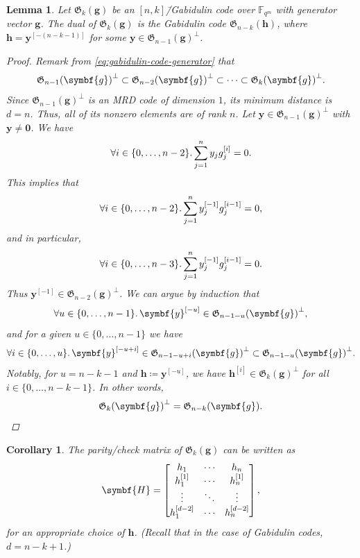 \documentclass[version=last, paper=A4, parskip=half, oneside,%
toc=bibliography, toc=listof, listof=leveldown]{scrbook}
\theoremstyle{plain}
\newtheorem{lemma}{Lemma}
\newtheorem{corollary}{Corollary}
\theoremstyle{definition}
\theoremstyle{remark}
\renewcommand*{\vec}{\symbf}
\newcommand*{\mat}{\symbf}
\newcommand*{\FF}{\ensuremath{\mathbb{F}}}
\newcommand*{\Gab}{\ensuremath{\mathfrak{G}}}
\begin{document}
\begin{lemma}
  Let \(\Gab_k(\vec{g})\) be an \([n, k]\)\=/Gabidulin code over \(\FF_{q^m}\)
  with generator vector \(\vec{g}\).  The dual of \(\Gab_k(\vec{g})\) is the
  Gabidulin code \(\Gab_{n - k}(\vec{h})\), where
  \(\vec{h} = \vec{y}^{[-(n - k - 1)]}\) for some
  \(\vec{y} \in {\Gab_{n - 1}(\vec{g})}^{\perp}\).
  \begin{proof}
    Remark from \cref{eq:gabidulin-code-generator} that
    \[
      {\Gab_{n - 1}(\vec{g})}^{\perp} \subset
      {\Gab_{n - 2}(\vec{g})}^{\perp} \subset \cdots \subset
      {\Gab_{k}(\vec{g})}^{\perp}\text.
    \]
    Since \({\Gab_{n - 1}(\vec{g})}^{\perp}\) is an MRD code of dimension \(1\),
    its minimum distance is \(d = n\).  Thus, all of its nonzero elements are of
    rank \(n\).  Let \(\vec{y} \in {\Gab_{n - 1}(\vec{g})}^{\perp}\) with
    \(\vec{y} \ne \vec{0}\).  We have
    \[
      \forall i \in \{0, \ldots, n - 2\}\ldotp
      \sum_{j = 1}^n y_j g_j^{[i]} = 0\text.
    \]
    This implies that
    \[
      \forall i \in \{0, \ldots, n - 2\}\ldotp
      \sum_{j = 1}^n y_j^{[-1]} g_j^{[i - 1]} = 0\text,
    \]
    and in particular,
    \[
      \forall i \in \{0, \ldots, n - 3\}\ldotp
      \sum_{j = 1}^n y_j^{[-1]} g_j^{[i - 1]} = 0\text.
    \]
    Thus \(\vec{y}^{[-1]} \in {\Gab_{n - 2}(\vec{g})}^{\perp}\).  We can argue
    by induction that
    \[
      \forall u \in \{0, \ldots, n - 1\}\ldotp
      \vec{y}^{[-u]} \in {\Gab_{n - 1 - u}(\vec{g})}^{\perp}\text,
    \]
    and for a given \(u \in \{0, \ldots, n - 1\}\) we have
    \[
      \forall i \in \{0, \ldots, u\}\ldotp
      \vec{y}^{[-u + i]} \in {\Gab_{n - 1 - u + i}(\vec{g})}^{\perp} \subset
      {\Gab_{n - 1 - u}(\vec{g})}^{\perp}\text.
    \]
    Notably, for \(u = n - k - 1\) and \(\vec{h} \coloneqq \vec{y}^{[-u]}\), we
    have \(\vec{h}^{[i]} \in {\Gab_k(\vec{g})}^{\perp}\) for all
    \(i \in \{0, \ldots, n - k - 1\}\).  In other words,
    \[
      {\Gab_k(\vec{g})}^{\perp} = \Gab_{n - k}(\vec{g})\text.
    \]
  \end{proof}
\end{lemma}

\begin{corollary}
  The parity\-/check matrix of \(\Gab_k(\vec{g})\) can be written as
  \[
    \mat{H} =
    \begin{bmatrix}
      h_1 & \cdots & h_n \\
      h_1^{[1]} & \cdots & h_n^{[1]} \\
      \vdots & \ddots & \vdots \\
      h_1^{[d - 2]} & \cdots & h_n^{[d - 2]}
    \end{bmatrix}\text,
  \]
  for an appropriate choice of \(\vec{h}\).  (Recall that in the case of
  Gabidulin codes, \(d = n - k + 1\).)
\end{corollary}
\end{document}
